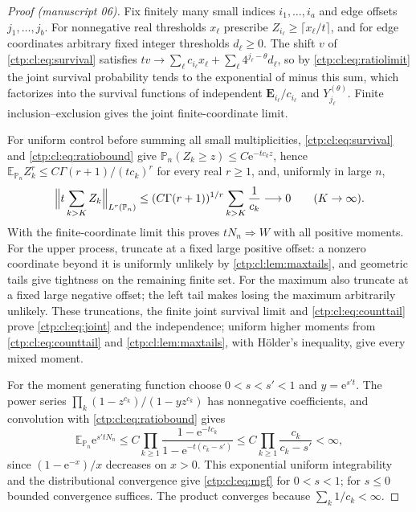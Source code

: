 \documentclass[11pt,a4paper]{article}
\numberwithin{equation}{section}
\theoremstyle{definition}
\theoremstyle{remark}
\newcommand{\e}{\mathrm e}
\newcommand{\PP}{\mathbb P}
\newcommand{\E}{\mathbb E}
\begin{document}
\begin{proof}[Proof (manuscript 06)]
Fix finitely many small indices $i_1,\ldots,i_a$ and edge offsets
$j_1,\ldots,j_b$. For nonnegative real thresholds $x_\ell$ prescribe
$Z_{i_\ell}\ge\lceil x_\ell/t\rceil$, and for edge coordinates arbitrary
fixed integer thresholds $d_\ell\ge0$. The shift $v$ of
\eqref{ctp:cl:eq:survival} satisfies
$tv\to\sum_\ell c_{i_\ell}x_\ell+\sum_\ell4^{j_\ell-\theta}d_\ell$, so by
\eqref{ctp:cl:eq:ratiolimit} the joint survival probability tends to the
exponential of minus this sum, which factorizes into the survival functions
of independent $\mathbf E_{i_\ell}/c_{i_\ell}$ and $Y^{(\theta)}_{j_\ell}$.
Finite inclusion--exclusion gives the joint finite-coordinate limit.

For uniform control before summing all small multiplicities,
\eqref{ctp:cl:eq:survival} and \eqref{ctp:cl:eq:ratiobound} give
$\PP_n(Z_k\ge z)\le C\e^{-tc_kz}$, hence
$\E_{\PP_n}Z_k^r\le C\Gamma(r+1)/(tc_k)^r$ for every real $r\ge1$, and,
uniformly in large $n$,
\begin{equation}\label{ctp:cl:eq:counttail}
 \Bigl\|t\sum_{k>K}Z_k\Bigr\|_{L^r(\PP_n)}\le(C\Gamma(r+1))^{1/r}\sum_{k>K}\frac1{c_k}
 \longrightarrow0\qquad(K\to\infty).
\end{equation}
With the finite-coordinate limit this proves $tN_n\Rightarrow W$ with all
positive moments. For the upper process, truncate at a fixed large positive
offset: a nonzero coordinate beyond it is uniformly unlikely by
\cref{ctp:cl:lem:maxtails}, and geometric tails give tightness on the
remaining finite set. For the maximum also truncate at a fixed large
negative offset; the left tail makes losing the maximum arbitrarily
unlikely. These truncations, the finite joint survival limit and
\eqref{ctp:cl:eq:counttail} prove \eqref{ctp:cl:eq:joint} and the
independence; uniform higher moments from \eqref{ctp:cl:eq:counttail} and
\cref{ctp:cl:lem:maxtails}, with H\"older's inequality, give every mixed
moment.

For the moment generating function choose $0<s<s'<1$ and $y=\e^{s't}$. The
power series $\prod_k(1-z^{c_k})/(1-yz^{c_k})$ has nonnegative coefficients,
and convolution with \eqref{ctp:cl:eq:ratiobound} gives
\[
 \E_{\PP_n}\e^{s'tN_n}\le C\prod_{k\ge1}\frac{1-\e^{-tc_k}}{1-\e^{-t(c_k-s')}}
 \le C\prod_{k\ge1}\frac{c_k}{c_k-s'}<\infty,
\]
since $(1-\e^{-x})/x$ decreases on $x>0$. This exponential uniform
integrability and the distributional convergence give \eqref{ctp:cl:eq:mgf}
for $0<s<1$; for $s\le0$ bounded convergence suffices. The product converges
because $\sum_k1/c_k<\infty$.
\end{proof}
\end{document}
